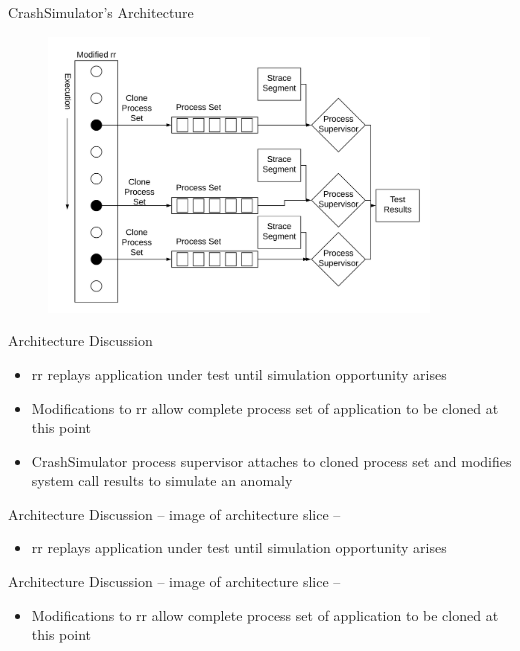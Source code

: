 \documentclass[pdf]{beamer}
\begin{document}
\begin{frame}{CrashSimulator's Architecture}
    \begin{figure}
    \centering
    \includegraphics[width = 0.9\textwidth]{images/architecture}
  \end{figure}
\end{frame}


\begin{frame}{Architecture Discussion}
  \begin{itemize}
    \item{rr replays application under test until simulation opportunity
      arises}
    \item{Modifications to rr allow complete process set of application to
      be cloned at this point}
    \item{CrashSimulator process supervisor attaches to cloned process set
      and modifies system call results to simulate an anomaly}
  \end{itemize}
\end{frame}


\begin{frame}{Architecture Discussion}
  -- image of architecture slice --
  \begin{itemize}
    \item{rr replays application under test until simulation opportunity
      arises}
  \end{itemize}
\end{frame}


\begin{frame}{Architecture Discussion}
  -- image of architecture slice --
  \begin{itemize}
    \item{Modifications to rr allow complete process set of application to
      be cloned at this point}
  \end{itemize}
\end{frame}
\end{document}
